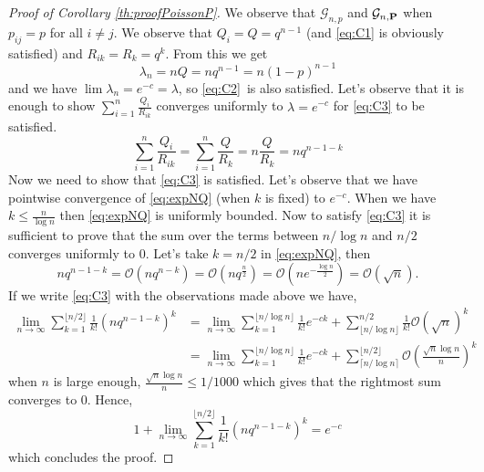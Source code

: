 \begin{proof}[Proof of Corollary \ref{th:proofPoissonP}]
	We observe that $\mathcal{G}_{n,p}$ and $\mathcal{G}_{n, \bold{P}}$ when $p_{ij} = p$ for all $i \neq j$.
	\newline
	We observe that $Q_i = Q = q^{n-1}$ (and \eqref{eq:C1} is obviously satisfied) and $R_{ik} = R_k = q^k$. 
	From this we get
	\begin{equation}
		\lambda_n = n Q = nq^{n-1} = n(1-p)^{n-1}
	\end{equation}
	and we have $\lim \lambda_n = e^{-c} = \lambda$, so \eqref{eq:C2} is also satisfied.
	\newline
	Let's observe that it is enough to show $\sum_{i=1}^n \frac{Q_i}{R_{ik}}$ converges uniformly to $\lambda = e^{-c}$ for \eqref{eq:C3} to be satisfied.
	\begin{equation}\label{eq:expNQ}
		\sum_{i=1}^n \frac{Q_i}{R_{ik}} = \sum_{i=1}^n \frac{Q}{R_k} = n \frac{Q}{R_k} = nq^{n-1-k}
	\end{equation}
	Now we need to show that \eqref{eq:C3} is satisfied.
	Let's observe that we have pointwise convergence of \eqref{eq:expNQ} (when $k$ is fixed) to $e^{-c}$.
	When we have $k \leq \frac{n}{\log n}$ then \eqref{eq:expNQ} is uniformly bounded.
	Now to satisfy \eqref{eq:C3} it is sufficient to prove that the sum over the terms between $n/\log n$ and $n/2$ converges uniformly to 0.
	Let's take $k=n/2$ in \eqref{eq:expNQ}, then
	\begin{equation}
		nq^{n-1-k} = \mathcal{O}(nq^{n-k}) = \mathcal{O}(nq^{\frac{n}{2}}) = \mathcal{O}(ne^{-\frac{\log n}{2}}) = \mathcal{O}(\sqrt{n}). 
	\end{equation}
	If we write \eqref{eq:C3} with the observations made above we have,
	\begin{align}
		\lim_{n\to \infty} \sum_{k=1}^{\lfloor n/2 \rfloor} \frac{1}{k!} (nq^{n-1-k})^k &=
		\lim_{n\to\infty} \sum_{k=1}^{\lfloor n/\log n \rfloor} \frac{1}{k!}e^{-ck} +  \sum_{\lfloor n/\log n \rfloor}^{n/2} \frac{1}{k!} \mathcal{O}(\sqrt{n})^k \\
		&= \lim_{n \to \infty} \sum_{k=1}^{\lfloor n/\log n \rfloor} \frac{1}{k!}e^{-ck} +  \sum_{\lceil n/\log n \rceil}^{\lfloor n/2\rfloor} \mathcal{O}(\frac{\sqrt{n}\log{n}}{n})^k 
	\end{align}
	when $n$ is large enough, $\frac{\sqrt{n}\log n}{n} \leq 1/1000$ which gives that the rightmost sum converges to 0.
	Hence, 
	\begin{equation}
		1 + \lim_{n\to \infty} \sum_{k=1}^{\lfloor n/2 \rfloor} \frac{1}{k!} (nq^{n-1-k})^k = e^{-c}
	\end{equation}
	which concludes the proof.
\end{proof}
